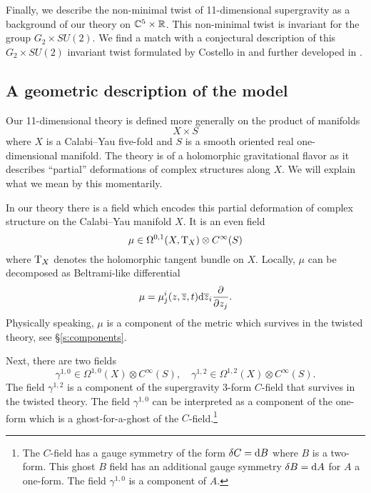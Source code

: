 Finally, we describe the non-minimal twist of 11-dimensional supergravity as a background of our theory on $\mathbb C^5 \times \mathbb R$. 
This non-minimal twist is invariant for the group $G_2 \times SU(2)$. 
We find a match with a conjectural description of this $G_2 \times SU(2)$ invariant twist formulated by Costello in \cite{CostelloM5} and further developed in \cite{RY}. 

\subsection*{A geometric description of the model} 

Our 11-dimensional theory is defined more generally on the product of manifolds 
\[
X \times S
\]
where $X$ is a Calabi--Yau five-fold and $S$ is a smooth oriented real one-dimensional manifold. 
The theory is of a holomorphic gravitational flavor as it describes ``partial'' deformations of complex structures along $X$. 
We will explain what we mean by this momentarily. 

In our theory there is a field which encodes this partial deformation of complex structure on the Calabi--Yau manifold $X$.
It is an even field 
\[
\mu \in \Omega^{0,1} (X , {\rm T}_X) \otimes C^\infty(S) 
\]
where ${\rm T}_X$ denotes the holomorphic tangent bundle on $X$.
Locally, $\mu$ can be decomposed as Beltrami-like differential
\[
\mu = \mu^i_j (z,\overline{z}, t) {\rm d} \overline{z}_i \frac{\partial}{\partial z_j} .
\]
Physically speaking, $\mu$ is a component of the metric which survives in the twisted theory, see \S \ref{s:components}. 

Next, there are two fields 
\[
\gamma^{1,0} \in \Omega^{1,0} (X) \otimes C^\infty(S), \quad \gamma^{1,2} \in \Omega^{1,2}(X) \otimes C^\infty(S) .
\]
The field $\gamma^{1,2}$ is a component of the supergravity $3$-form $C$-field that survives in the twisted theory. 
The field $\gamma^{1,0}$ can be interpreted as a component of the one-form which is a ghost-for-a-ghost of the $C$-field.\footnote{The $C$-field has a gauge symmetry of the form $\delta C = {\rm d} B$ where $B$ is a two-form.
This ghost $B$ field has an additional gauge symmetry $\delta B = {\rm d} A$ for $A$ a one-form.
The field $\gamma^{1,0}$ is a component of $A$.}

